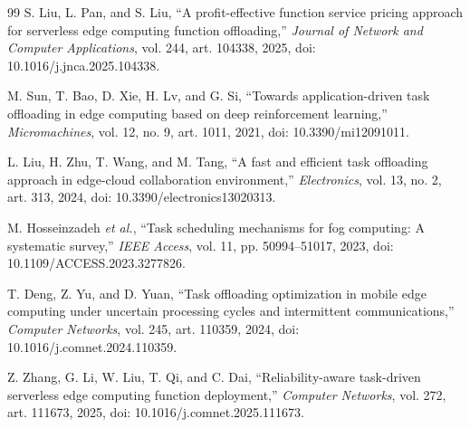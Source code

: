 \documentclass[conference]{IEEEtran}
\begin{document}
\begin{thebibliography}{99}
 S. Liu, L. Pan, and S. Liu, ``A profit-effective function service pricing approach for serverless edge computing function offloading,'' \emph{Journal of Network and Computer Applications}, vol. 244, art. 104338, 2025, doi: 10.1016/j.jnca.2025.104338.

 M. Sun, T. Bao, D. Xie, H. Lv, and G. Si, ``Towards application-driven task offloading in edge computing based on deep reinforcement learning,'' \emph{Micromachines}, vol. 12, no. 9, art. 1011, 2021, doi: 10.3390/mi12091011.

 L. Liu, H. Zhu, T. Wang, and M. Tang, ``A fast and efficient task offloading approach in edge-cloud collaboration environment,'' \emph{Electronics}, vol. 13, no. 2, art. 313, 2024, doi: 10.3390/electronics13020313.

 M. Hosseinzadeh \emph{et al.}, ``Task scheduling mechanisms for fog computing: A systematic survey,'' \emph{IEEE Access}, vol. 11, pp. 50994--51017, 2023, doi: 10.1109/ACCESS.2023.3277826.

 T. Deng, Z. Yu, and D. Yuan, ``Task offloading optimization in mobile edge computing under uncertain processing cycles and intermittent communications,'' \emph{Computer Networks}, vol. 245, art. 110359, 2024, doi: 10.1016/j.comnet.2024.110359.

 Z. Zhang, G. Li, W. Liu, T. Qi, and C. Dai, ``Reliability-aware task-driven serverless edge computing function deployment,'' \emph{Computer Networks}, vol. 272, art. 111673, 2025, doi: 10.1016/j.comnet.2025.111673.
\end{thebibliography}
\end{document}
